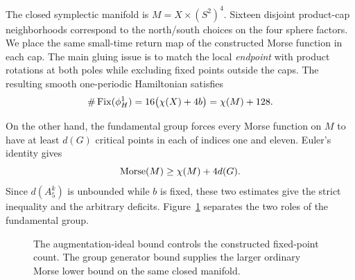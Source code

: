 The closed symplectic manifold is
$M=X\times(S^2)^4$. Sixteen disjoint product-cap neighborhoods correspond
to the north/south choices on the four sphere factors. We place the same
small-time return map of the constructed Morse function in each cap.
The main gluing issue is to match the local \emph{endpoint} with product
rotations at both poles while excluding fixed points outside the caps.
The resulting smooth one-periodic Hamiltonian satisfies
\begin{equation}\label{eq:overview-fixed-count}
 \#\operatorname{Fix}(\phi_H^1)=16\bigl(\chi(X)+4b\bigr)
                   =\chi(M)+128.
\end{equation}

On the other hand, the fundamental group forces every Morse function on
$M$ to have at least $d(G)$ critical points in each of indices one and
eleven. Euler's identity gives
\begin{equation}\label{eq:overview-morse-bound}
 \operatorname{Morse}(M)\ge\chi(M)+4d(G).
\end{equation}
Since $d(A_5^k)$ is unbounded while $b$ is fixed, these two estimates
give the strict inequality and the arbitrary deficits. Figure~\ref{fig:construction}
separates the two roles of the fundamental group.

\begin{figure}[ht]
\centering
{}
\caption{The augmentation-ideal bound controls the constructed fixed-point
count. The group generator bound supplies the larger ordinary Morse
lower bound on the same closed manifold.}
\label{fig:construction}
\end{figure}

